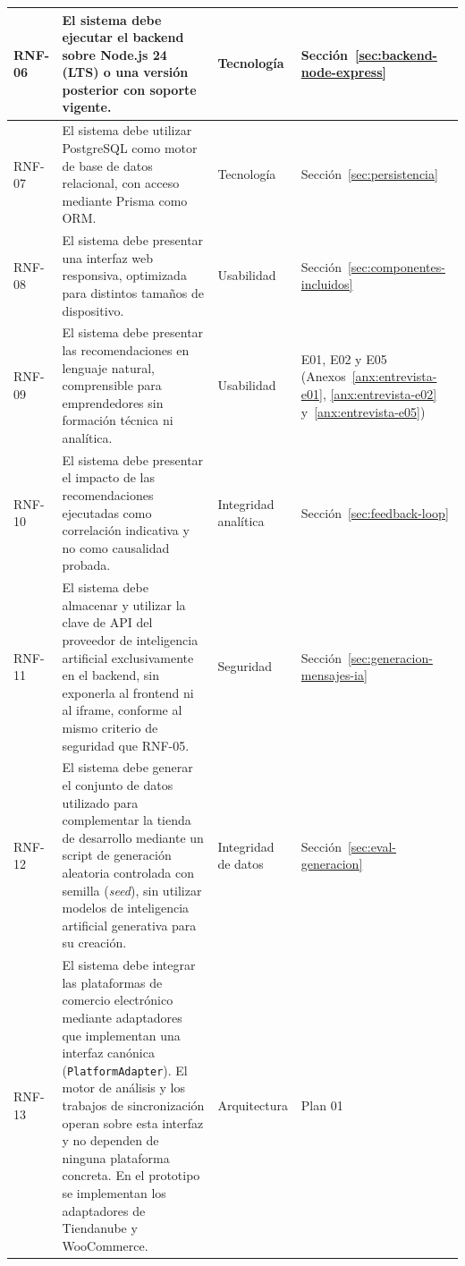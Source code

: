 \begin{longtable}{|m{1.5cm}|m{8.4cm}|m{2.4cm}|m{2.6cm}|}
RNF-06 & El sistema debe ejecutar el backend sobre Node.js 24 (LTS) o una versión posterior con soporte vigente. & Tecnología & Sección~\ref{sec:backend-node-express} \\
\hline

RNF-07 & El sistema debe utilizar PostgreSQL como motor de base de datos relacional, con acceso mediante Prisma como ORM. & Tecnología & Sección~\ref{sec:persistencia} \\
\hline

RNF-08 & El sistema debe presentar una interfaz web responsiva, optimizada para distintos tamaños de dispositivo. & Usabilidad & Sección~\ref{sec:componentes-incluidos} \\
\hline

RNF-09 & El sistema debe presentar las recomendaciones en lenguaje natural, comprensible para emprendedores sin formación técnica ni analítica. & Usabilidad & E01, E02 y E05 (Anexos~\ref{anx:entrevista-e01}, \ref{anx:entrevista-e02} y~\ref{anx:entrevista-e05}) \\
\hline


RNF-10 & El sistema debe presentar el impacto de las recomendaciones ejecutadas como correlación indicativa y no como causalidad probada. & Integridad analítica & Sección~\ref{sec:feedback-loop} \\
\hline

RNF-11 & El sistema debe almacenar y utilizar la clave de API del proveedor de inteligencia artificial exclusivamente en el backend, sin exponerla al frontend ni al iframe, conforme al mismo criterio de seguridad que RNF-05. & Seguridad & Sección~\ref{sec:generacion-mensajes-ia} \\
\hline

RNF-12 & El sistema debe generar el conjunto de datos utilizado para complementar la tienda de desarrollo mediante un script de generación aleatoria controlada con semilla (\emph{seed}), sin utilizar modelos de inteligencia artificial generativa para su creación. & Integridad de datos & Sección~\ref{sec:eval-generacion} \\
\hline

RNF-13 & El sistema debe integrar las plataformas de comercio electrónico mediante adaptadores que implementan una interfaz canónica (\texttt{PlatformAdapter}). El motor de análisis y los trabajos de sincronización operan sobre esta interfaz y no dependen de ninguna plataforma concreta. En el prototipo se implementan los adaptadores de Tiendanube y WooCommerce. & Arquitectura & Plan 01 \\
\hline


\end{longtable}

